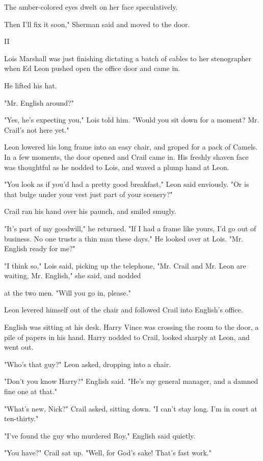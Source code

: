 \documentclass{novel}
\begin{document}
The amber-colored eyes dwelt on her face speculatively.

Then I'll fix it soon," Sherman said and moved to the door.



II

Lois Marshall was just finishing dictating a batch of cables to her stenographer when Ed Leon pushed open the office door and came in.

He lifted his hat.

"Mr. English around?"

"Yes, he's expecting you," Lois told him. "Would you sit down for a moment? Mr. Crail's not here yet."

Leon lowered his long frame into an easy chair, and groped for a pack of Camels. In a few moments, the door opened and Crail came in. His freshly shaven face was thoughtful as he nodded to Lois, and waved a plump hand at Leon.

"You look as if you'd had a pretty good breakfast," Leon said enviously. "Or is that bulge under your vest just part of your scenery?"

Crail ran his hand over his paunch, and smiled smugly.

"It's part of my goodwill," he returned. "If I had a frame like yours, I'd go out of business. No one trusts a thin man these days." He looked over at Lois. "Mr. English ready for me?"

"I think so," Lois said, picking up the telephone, "Mr. Crail and Mr. Leon are waiting, Mr. English," she said, and nodded

at the two men. "Will you go in, please."

Leon levered himself out of the chair and followed Crail into English's office.

English was sitting at his desk. Harry Vince was crossing the room to the door, a pile of papers in his hand. Harry nodded to Crail, looked sharply at Leon, and went out.

"Who's that guy?" Leon asked, dropping into a chair.

"Don't you know Harry?" English said. "He's my general manager, and a damned fine one at that."

"What's new, Nick?" Crail asked, sitting down. "I can't stay long. I'm in court at ten-thirty."

"I've found the guy who murdered Roy," English said quietly.

"You have?" Crail sat up. "Well, for God's sake! That's fast work."
\end{document}

